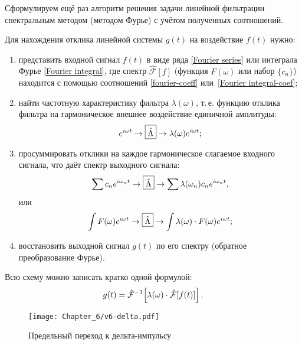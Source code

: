 Сформулируем ещё раз алгоритм решения задачи линейной фильтрации
спектральным методом (методом Фурье) с учётом полученных соотношений.

Для нахождения отклика линейной системы $g(t)$ на воздействие $f(t)$
нужно:
\begin{enumerate}[label=\arabic*)]
    \item представить входной сигнал $f(t)$ в виде ряда
    \eqref{Fourier series} или интеграла Фурье \eqref{Fourier integral},
где спектр $\hat{\mathcal{F}}[f]$ (функция $F(\omega)$ или набор $\{c_n\}$)
находится с помощью соотношений \eqref{fourier-coeff}
или~\eqref{Fourier integral-coef};

    \item найти частотную характеристику фильтра
$\lambda(\omega)$, т.\,е. функцию отклика фильтра на гармоническое внешнее воздействие
единичной амплитуды:
\begin{equation*}
    e^{i\omega t}\to\fbox{$\hat\Lambda$}\to \lambda(\omega)e^{i\omega t};
\end{equation*}

    \item просуммировать отклики на каждое гармоническое
    слагаемое входного сигнала, что даёт спектр выходного сигнала:
    \begin{equation*}
    \sum c_n e^{i\omega_n t} \to\fbox{$\hat\Lambda$}\to \sum \lambda(\omega_n)c_n e^{i\omega_n t},
    \end{equation*}
    или
    \begin{equation*}
    \int F(\omega) e^{i\omega t} \to\fbox{$\hat\Lambda$}\to
    \int \lambda(\omega)\cdot F(\omega)e^{i\omega t};
    \end{equation*}
    \item восстановить выходной сигнал $g(t)$ по его спектру
    (обратное преобразование Фурье).
\end{enumerate}
Всю схему можно записать кратко одной формулой:
    \begin{equation}
        \eqmark{linear-filter-fourier}
    g(t) = \hat{\mathcal{F}}^{-1}\!
    \left[\lambda(\omega)\cdot \hat{\mathcal{F}}[f(t)]\right].
    \end{equation}


\begin{wrapfigure}[15]{o}{0.22\textwidth}
     \centering\texttt{[image: Chapter\_6/v6-delta.pdf]}
     \caption{\footnotesize Предельный переход к дельта-импульсу}
\end{wrapfigure}

